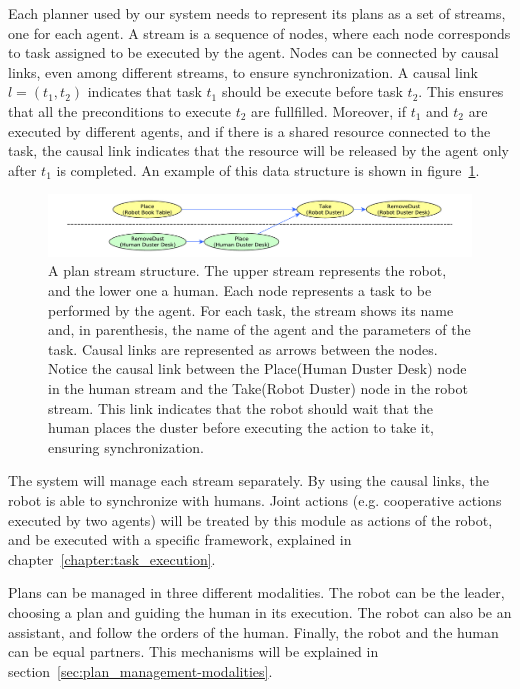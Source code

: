 Each planner used by our system needs to represent its plans as a set of streams, one for each agent. A stream is a sequence of nodes, where each node corresponds to task assigned to be executed by the agent. Nodes can be connected by causal links, even among different streams, to ensure synchronization. A causal link $l=(t_1,t_2)$ indicates that  task $t_1$ should be execute before task $t_2$. This ensures that all the preconditions to execute $t_2$ are fullfilled. Moreover, if $t_1$ and $t_2$ are executed by different agents, and if there is a shared resource connected to the task, the causal link indicates that the resource will be released by the agent only after $t_1$ is completed. An example of this data structure is shown in figure~\ref{fig:plan_management-streams}.

\begin{figure}[ht!]
 \centering
  \includegraphics[scale=0.45]{img/coworker/plan_management/streams.pdf}
 \caption[Plan data structures]{
 A plan stream structure. The upper stream represents the robot, and the lower one a human. Each node represents a task to be performed by the agent. For each task, the stream shows its name and, in parenthesis, the name of the agent and the parameters of the task. Causal links are represented as arrows between the nodes. Notice the causal link between the Place(Human Duster Desk) node in the human stream and the Take(Robot Duster) node in the robot stream. This link indicates that the robot should wait that the human places the duster before executing the action to take it, ensuring synchronization.}
 \label{fig:plan_management-streams}
 \end{figure}

The system will manage each stream separately. By using the causal links, the robot is able to synchronize with humans. Joint actions (e.g. cooperative actions executed by two agents) will be treated by this module as actions of the robot, and be executed with a specific framework,  explained in chapter~\ref{chapter:task_execution}.

Plans can be managed in three different modalities. The robot can be the leader, choosing a plan and guiding the human in its execution. The robot can also be an assistant, and follow the orders of the human. Finally, the robot and the human can be equal partners. This mechanisms will be explained in section~\ref{sec:plan_management-modalities}.


